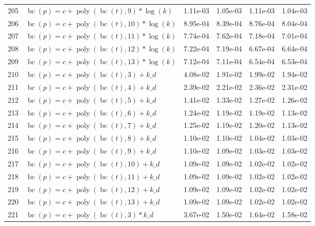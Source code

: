 \documentclass[12pt,a4paper]{article}
\DeclareMathOperator{\bc}{bc}
\DeclareMathOperator{\poly}{poly}
\begin{document}
\begin{longtable}[t]{ll>{\raggedleft\arraybackslash}p{2cm}>{\raggedleft\arraybackslash}p{2cm}>{\raggedleft\arraybackslash}p{2cm}>{\raggedleft\arraybackslash}p{2cm}}
\rowcolor{gray!6}  205 & $\bc(p) = c + \poly\left( \bc(t), 9 \right) * \log(k)$ & 1.11e-03 & 1.05e-03 & 1.11e-03 & 1.04e-03\\
206 & $\bc(p) = c + \poly\left( \bc(t), 10 \right) * \log(k)$ & 8.95e-04 & 8.39e-04 & 8.76e-04 & 8.04e-04\\
\rowcolor{gray!6}  207 & $\bc(p) = c + \poly\left( \bc(t), 11 \right) * \log(k)$ & 7.74e-04 & 7.62e-04 & 7.18e-04 & 7.01e-04\\
208 & $\bc(p) = c + \poly\left( \bc(t), 12 \right) * \log(k)$ & 7.22e-04 & 7.19e-04 & 6.67e-04 & 6.64e-04\\
\rowcolor{gray!6}  209 & $\bc(p) = c + \poly\left( \bc(t), 13 \right) * \log(k)$ & 7.12e-04 & 7.11e-04 & 6.54e-04 & 6.53e-04\\
210 & $\bc(p) = c + \poly\left( \bc(t), 3 \right) + k\_d$ & 4.08e-02 & 1.91e-02 & 1.99e-02 & 1.94e-02\\
\rowcolor{gray!6}  211 & $\bc(p) = c + \poly\left( \bc(t), 4 \right) + k\_d$ & 2.39e-02 & 2.21e-02 & 2.36e-02 & 2.31e-02\\
212 & $\bc(p) = c + \poly\left( \bc(t), 5 \right) + k\_d$ & 1.41e-02 & 1.33e-02 & 1.27e-02 & 1.26e-02\\
\rowcolor{gray!6}  213 & $\bc(p) = c + \poly\left( \bc(t), 6 \right) + k\_d$ & 1.24e-02 & 1.19e-02 & 1.19e-02 & 1.13e-02\\
214 & $\bc(p) = c + \poly\left( \bc(t), 7 \right) + k\_d$ & 1.25e-02 & 1.19e-02 & 1.20e-02 & 1.13e-02\\
\rowcolor{gray!6}  215 & $\bc(p) = c + \poly\left( \bc(t), 8 \right) + k\_d$ & 1.10e-02 & 1.10e-02 & 1.04e-02 & 1.03e-02\\
216 & $\bc(p) = c + \poly\left( \bc(t), 9 \right) + k\_d$ & 1.10e-02 & 1.09e-02 & 1.03e-02 & 1.03e-02\\
\rowcolor{gray!6}  217 & $\bc(p) = c + \poly\left( \bc(t), 10 \right) + k\_d$ & 1.09e-02 & 1.09e-02 & 1.02e-02 & 1.02e-02\\
218 & $\bc(p) = c + \poly\left( \bc(t), 11 \right) + k\_d$ & 1.09e-02 & 1.09e-02 & 1.02e-02 & 1.02e-02\\
\rowcolor{gray!6}  219 & $\bc(p) = c + \poly\left( \bc(t), 12 \right) + k\_d$ & 1.09e-02 & 1.09e-02 & 1.02e-02 & 1.02e-02\\
220 & $\bc(p) = c + \poly\left( \bc(t), 13 \right) + k\_d$ & 1.09e-02 & 1.09e-02 & 1.02e-02 & 1.02e-02\\
\rowcolor{gray!6}  221 & $\bc(p) = c + \poly\left( \bc(t), 3 \right) * k\_d$ & 3.67e-02 & 1.50e-02 & 1.64e-02 & 1.58e-02\\

\end{longtable}
\end{document}
